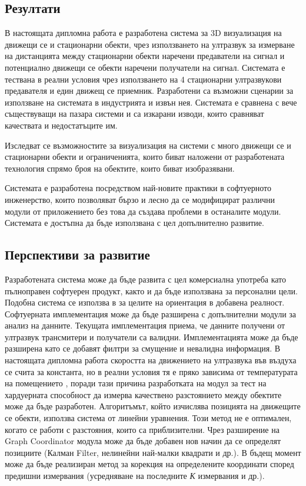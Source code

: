 \subsection{Резултати}

В настоящата дипломна работа е разработена система за 3D визуализация на движещи се и стационарни обекти, чрез използването на ултразвук за измерване на дистанцията между стационарни обекти наречени предаватели на сигнал и потенциално движещи се обекти наречени получатели на сигнал. Системата е тествана в реални условия чрез използването на 4 стационарни ултразвукови предавателя и един движещ се приемник. Разработени са възможни сценарии за използване на системата в индустрията и извън нея. Системата е сравнена с вече съществуващи на пазара системи и са изкарани изводи, които сравняват качествата и недостатъците им.

Изследват се възможностите за визуализация на системи с много движещи се и стационарни обекти и ограниченията, които биват наложени от разработената технология спрямо броя на обектите, които биват изобразявани.

Системата е разработена посредством най-новите практики в софтуерното инженерство, които позволяват бързо и лесно да се модифицират различни модули от приложението без това да създава проблеми в останалите модули. Системата е достъпна да бъде използвана с цел допълнително развитие.

\subsection{Перспективи за развитие}
Разработената система може да бъде развита с цел комерсиална употреба като пълноправен софтуерен продукт, както и да бъде използвана за персонални цели. Подобна система се използва в \cite{vr} за целите на ориентация в добавена реалност. Софтуерната имплементация може да бъде разширена с допълнителни модули за анализ на данните. Текущата имплементация приема, че данните получени от ултразвук трансмитери и получатели са валидни. Имплементацията може да бъде разширена като се добавят филтри за смущение и невалидна информация. В настоящата дипломна работа скоростта на движението на ултразвука във въздуха се счита за константа, но в реални условия тя е пряко зависима от температурата на помещението \cite{vr}, поради тази причина разработката на модул за тест на хардуерната способност да измерва качествено разстоянието между обектите може да бъде разработен. Алгоритъмът, който изчислява позицията на движещите се обекти, използва система от линейни уравнения. Този метод не е оптимален, когато се работи с разстояния, които са приблизителни. Чрез разширение на Graph Coordinator модула може да бъде добавен нов начин да се определят позициите (Калман Filter, нелинейни най-малки квадрати и др.). В бъдещ момент може да бъде реализиран метод за корекция на определените координати според предишни измервания (усредняване на последните \textit{К} измервания и др.).

